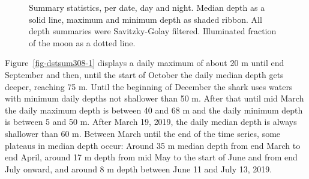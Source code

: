 \documentclass[
  authoryear,
  review,
  3p]{elsarticle}
\begin{document}
\begin{figure}

\begin{minipage}[t]{\linewidth}

{\centering 


}

\end{minipage}%
\newline
\begin{minipage}[t]{0.50\linewidth}

{\centering 


}

\end{minipage}%
%
\begin{minipage}[t]{0.50\linewidth}

{\centering 


}

\end{minipage}%

\caption{\label{fig-dstsum308}Summary statistics, per date, day and
night. Median depth as a solid line, maximum and minimum depth as shaded
ribbon. All depth summaries were Savitzky-Golay filtered. Illuminated
fraction of the moon as a dotted line.}

\end{figure}

Figure~\ref{fig-dstsum308-1} displays a daily maximum of about 20 m
until end September and then, until the start of October the daily
median depth gets deeper, reaching 75 m. Until the beginning of December
the shark uses waters with minimum daily depths not shallower than 50 m.
After that until mid March the daily maximum depth is between 40 and 68
m and the daily minimum depth is between 5 and 50 m. After March 19,
2019, the daily median depth is always shallower than 60 m. Between
March until the end of the time series, some plateaus in median depth
occur: Around 35 m median depth from end March to end April, around 17 m
depth from mid May to the start of June and from end July onward, and
around 8 m depth between June 11 and July 13, 2019.
\end{document}

